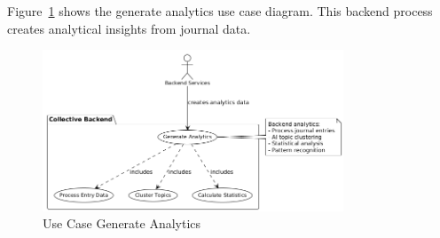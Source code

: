 Figure~\ref{fig:usecase-generate-analytics} shows the generate analytics use case diagram. This backend process creates analytical insights from journal data.

\begin{figure}[H]
\centering
\includegraphics[width=0.8\textwidth]{files/imgs/usecase_U9ojaazhma.png}
\caption{Use Case Generate Analytics}
\label{fig:usecase-generate-analytics}
\end{figure}

